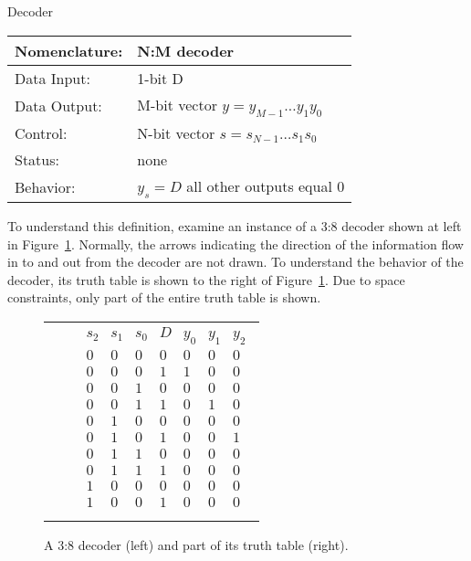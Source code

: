 \begin{buildingblock}{Decoder}
    \label{buildingblock:decoder}
        \begin{tabular}{|l|p{3.5in}|} \hline
            Nomenclature:  & N:M decoder                \\ \hline
            Data Input:    & 1-bit D        \\ \hline
            Data Output:   & M-bit vector $y = y_{M-1} \ldots y_1 y_0$    \\ \hline
            Control:       & N-bit vector $s = s_{N-1} \ldots s_1 s_0$    \\ \hline
            Status:        & none                    \\ \hline
            Behavior:      & $y_s = D$ all other outputs equal 0    \\ \hline
        \end{tabular}
        \label{page:dec}
    \end{buildingblock}

    To understand this definition, examine an
    instance of a 3:8 decoder shown at left in Figure~\ref{fig:comboBB3:8}.
    Normally, the arrows indicating the direction of the information
    flow in to and out from the decoder are not drawn.
    To understand the behavior of the decoder, its
    truth table is shown to the right of Figure~\ref{fig:comboBB3:8}.
    Due to space constraints, only part of the entire truth
    table is shown.

    \begin{figure}[ht]
        \begin{tabular}[b]{p{1.0in}p{0.5in}l}
            \includegraphics[0mm,20mm][12mm,12mm]{3_8} & &
            $
            \begin{array}{c|c|c|c||c|c|c}
                s_2 & s_1 & s_0 & D & y_0 & y_1 & y_2\\ \hline
                0 & 0 & 0 & 0     & 0  &   0 &   0\\ \hline
                0 & 0 & 0 & 1     & 1  &   0 &   0\\ \hline
                0 & 0 & 1 & 0     & 0  &   0 &   0\\ \hline
                0 & 0 & 1 & 1     & 0  &   1 &   0\\ \hline
                0 & 1 & 0 & 0     & 0  &   0 &   0\\ \hline
                0 & 1 & 0 & 1     & 0  &   0 &   1\\ \hline
                0 & 1 & 1 & 0     & 0  &   0 &   0\\ \hline
                0 & 1 & 1 & 1     & 0  &   0 &   0\\ \hline
                1 & 0 & 0 & 0     & 0  &   0 &   0\\ \hline
                1 & 0 & 0 & 1     & 0  &   0 &   0\\
            \end{array}$ \\
        \end{tabular}
        \caption{A 3:8 decoder (left) and part of its truth table (right).}
        \label{fig:comboBB3:8}
    \end{figure}

